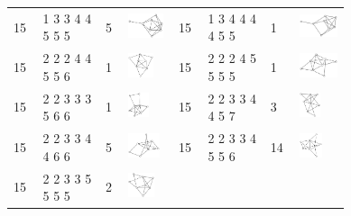 \begin{footnotesize}
\begin{longtable}{
        m{0.05\linewidth} m{0.15\linewidth} m{0.05\linewidth} m{0.12\linewidth} |
        m{0.05\linewidth} m{0.15\linewidth} m{0.05\linewidth} m{0.12\linewidth}
    }
15 & 1 3 3 4 4 5 5 5 & 5 & \includegraphics[height=0.7151cm]{15-universal-graphs/img/degree-sequences-example-graphs/graph-4-8-106} &
15 & 1 3 4 4 4 4 5 5 & 1 & \includegraphics[height=0.7151cm]{15-universal-graphs/img/degree-sequences-example-graphs/graph-4-8-107}\\
15 & 2 2 2 4 4 5 5 6 & 1 & \includegraphics[height=0.7151cm]{15-universal-graphs/img/degree-sequences-example-graphs/graph-4-8-108} &
15 & 2 2 2 4 5 5 5 5 & 1 & \includegraphics[height=0.7151cm]{15-universal-graphs/img/degree-sequences-example-graphs/graph-4-8-109}\\
15 & 2 2 3 3 3 5 6 6 & 1 & \includegraphics[height=0.7151cm]{15-universal-graphs/img/degree-sequences-example-graphs/graph-4-8-110} &
15 & 2 2 3 3 4 4 5 7 & 3 & \includegraphics[height=0.7151cm]{15-universal-graphs/img/degree-sequences-example-graphs/graph-4-8-111}\\
15 & 2 2 3 3 4 4 6 6 & 5 & \includegraphics[height=0.7151cm]{15-universal-graphs/img/degree-sequences-example-graphs/graph-4-8-112} &
15 & 2 2 3 3 4 5 5 6 & 14 & \includegraphics[height=0.7151cm]{15-universal-graphs/img/degree-sequences-example-graphs/graph-4-8-113}\\
15 & 2 2 3 3 5 5 5 5 & 2 & \includegraphics[height=0.7151cm]{15-universal-graphs/img/degree-sequences-example-graphs/graph-4-8-114} &

\end{longtable}
\end{footnotesize}
